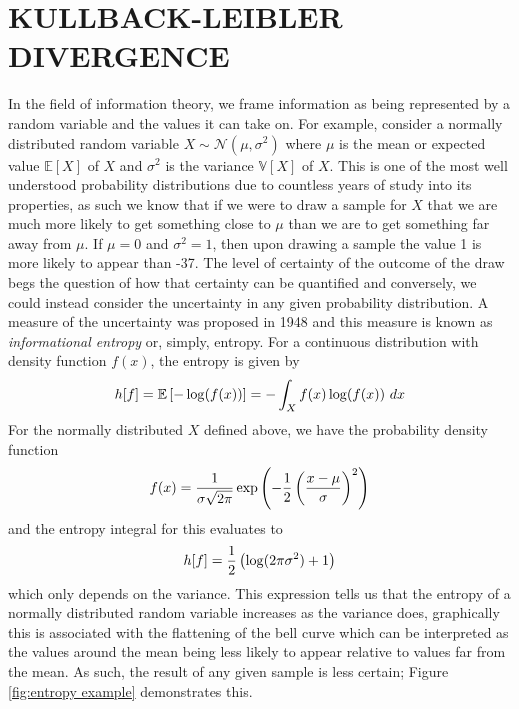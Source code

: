 \chapter{KULLBACK-LEIBLER DIVERGENCE}
\label{chap:KLD}
In the field of information theory, we frame information as being 
represented by a random variable and the values it can take on. For example, consider 
a normally distributed random variable $X \sim \mathcal{N}(\mu, \sigma^2)$ where $\mu$ is the 
mean or expected value $\mathbb{E}[X]$ of $X$ and $\sigma^2$ is the variance 
$\mathbb{V}[X]$ of $X$. This is one of the most well understood probability distributions
due to countless years of study into its properties, as such we know that if we were to 
draw a sample for $X$ that we are much more likely to get something close to $\mu$
than we are to get something far away from $\mu$. If $\mu = 0$ and 
$\sigma^2 = 1$, then upon drawing a sample the value 1 is more likely to appear
than -37. The level of certainty of the outcome of the draw begs the question of 
how that certainty can be quantified and conversely, we could instead consider the 
uncertainty in any given probability distribution. A measure of the uncertainty was 
proposed in 1948 and this measure is known as \emph{informational entropy} \cite{shannon}
or, simply, entropy. For a
continuous distribution with density function $f(x)$, the entropy is given by 
\begin{equation}
    h[f] = \mathbb{E}\left[-\log(f(x))\right] = -\int_X f(x)\log(f(x))\ dx    
\end{equation}
For the normally distributed $X$ defined above, we have the probability density function
\begin{equation}
   f(x) = \frac{1}{\sigma\sqrt{2\pi}}\exp\left(-\frac{1}{2}\left(\frac{x-\mu}{\sigma}\right)^2\right) 
   \label{eqn:normal} 
\end{equation}
and the entropy integral for this evaluates to
\begin{equation}
    h[f] = \frac{1}{2}\left(\log(2\pi\sigma^2) + 1\right)
\end{equation}
which only depends on the variance. This expression tells us that the entropy of a
normally distributed random variable increases as the variance does, graphically this is 
associated with the flattening of the bell curve which can be interpreted as the values 
around the mean being less likely to appear relative to values far from the mean. As such, 
the result of any given sample is less certain; Figure \ref{fig:entropy example} demonstrates 
this.

